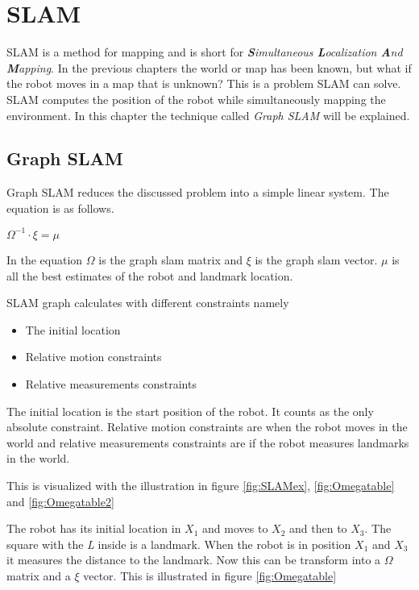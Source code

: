 \chapter{SLAM}
\label{chp:slam}

SLAM is a method for mapping and is short for \emph{\textbf{S}imultaneous \textbf{L}ocalization \textbf{A}nd \textbf{M}apping}.
In the previous chapters the world or map has been known, but what if the robot moves in a map that is unknown? This is a problem SLAM can solve. SLAM computes the position of the robot while simultaneously mapping the environment. In this chapter the technique called \emph{Graph SLAM} will be explained.

\section{Graph SLAM}

Graph SLAM reduces the discussed problem into a simple linear system. The equation is as follows.

\begin{center}
	$\Omega^{-1} \cdot \xi = \mu$
\end{center}

In the equation $\Omega$ is the graph slam matrix and $\xi$ is the graph slam vector. $\mu$ is all the best estimates of the robot and landmark location.

SLAM graph calculates with different constraints namely

\begin{itemize}
	\item The initial location
	\item Relative motion constraints
	\item Relative measurements constraints
\end{itemize}

The initial location is the start position of the robot. It counts as the only absolute constraint. Relative motion constraints are when the robot moves in the world and relative measurements constraints are if the robot measures landmarks in the world.

This is visualized with the illustration in figure \ref{fig:SLAMex}, \ref{fig:Omegatable} and \ref{fig:Omegatable2}

 
The robot has its initial location in $X_1$ and moves to $X_2$ and then to $X_3$. The square with the \emph{L} inside is a landmark. When the robot is in position $X_1$ and $X_3$ it measures the distance to the landmark.
Now this can be transform into a $\Omega$ matrix and a $\xi$ vector. This is illustrated in figure \ref{fig:Omegatable}

